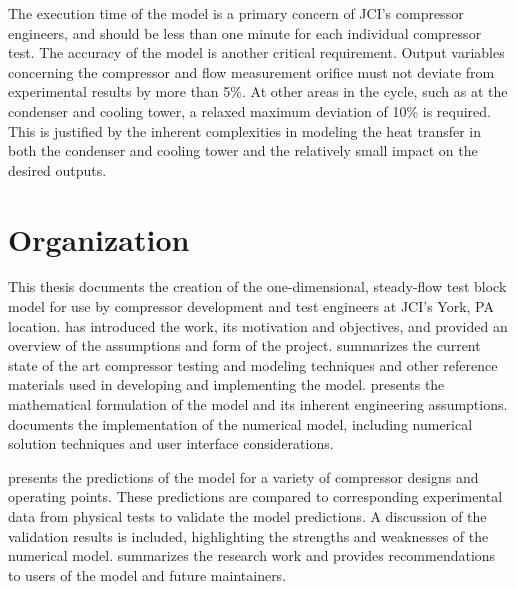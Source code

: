 The execution time of the model is a primary concern of JCI's compressor engineers, 
and should be less than one minute for each individual compressor test.
The accuracy of the model is another critical requirement.
Output variables concerning the compressor and flow measurement orifice 
must not deviate from experimental results by more than 5\%.
At other areas in the cycle, such as at the condenser and cooling tower,
a relaxed maximum deviation of 10\% is required.
This is justified by the inherent complexities in modeling the heat transfer
in both the condenser and cooling tower and the relatively small impact
on the desired outputs.

\section{Organization} \label{sec:organization}
This thesis documents the creation of the one-dimensional, 
steady-flow test block model for use by compressor 
development and test engineers at JCI's York, PA location.
 has introduced the work, its motivation and objectives,
and provided an overview of the assumptions and form of the project.
 summarizes the current state of the art 
compressor testing and modeling techniques 
and other reference materials used in developing and implementing the model. 
 presents the mathematical formulation of the model 
and its inherent engineering assumptions. 
 documents the implementation of the numerical model, 
including numerical solution techniques and user interface considerations. 

 presents the predictions of the model 
for a variety of compressor designs and operating points. 
These predictions are compared to corresponding experimental data 
from physical tests to validate the model predictions.
A discussion of the validation results is included, 
highlighting the strengths and weaknesses of the numerical model.
 summarizes the research work 
and provides recommendations to users of the model and future maintainers.

